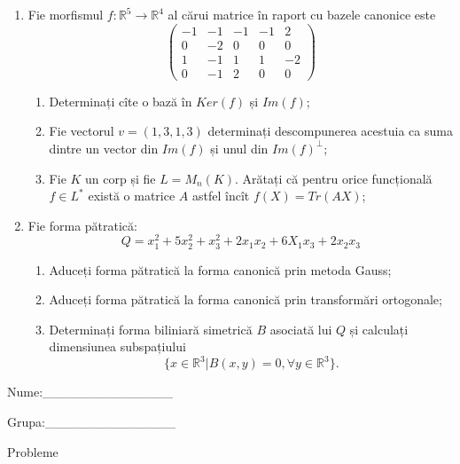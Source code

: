 \documentclass{article}
\begin{document}
\begin{enumerate}
 \item Fie morfismul $f:\mathbb{R}^5 \to \mathbb{R}^4$ al cărui matrice în raport cu bazele canonice este
$$\begin{pmatrix}
-1&-1&-1&-1&2\\
0&-2&0&0&0\\
1&-1&1&1&-2\\
0&-1&2&0&0
\end{pmatrix}$$

\begin{enumerate}
\item Determinați cîte o bază în $Ker(f)$ și $Im(f)$;
\item Fie vectorul $v=(1,3,1,3)$ determinați descompunerea acestuia ca suma dintre un vector din $Im(f)$ și unul din $Im(f)^\perp$;
\item Fie $K$ un corp și fie $L=M_n(K)$. Arătați că pentru orice funcțională $f \in L^*$ există o matrice $A$ astfel încît $f(X)=Tr(AX)$;
\end{enumerate}
\item Fie forma pătratică:
$$Q= x_1^2+5x_2^2+x_3^2+2x_1x_2+6X_1x_3+2x_2x_3$$

\begin{enumerate}
\item Aduceți forma pătratică la forma canonică prin metoda Gauss;
\item Aduceți forma pătratică la forma canonică prin transformări ortogonale;
\item Determinați forma biliniară simetrică $B$ asociată lui $Q$ și calculați dimensiunea subspațiului
$$\{x \in \mathbb{R}^3 | B(x,y)=0,\forall y \in \mathbb{R}^3\}.$$

\end{enumerate}
\end{enumerate}
\newpage
\begin{flushright}
Nume:\_\_\_\_\_\_\_\_\_\_\_\_\_\_
 
 
Grupa:\_\_\_\_\_\_\_\_\_\_\_\_\_\_
\end{flushright}
\begin{center}
\vspace{2cm}
{\Large Probleme}
\vspace{2cm}
\end{center}
\end{document}

